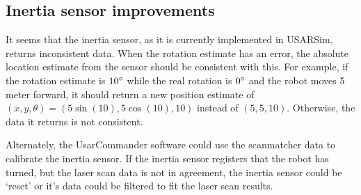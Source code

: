 \subsection{Inertia sensor improvements}
It seems that the inertia sensor, as it is currently implemented in USARSim, returns inconsistent data. When the rotation estimate has an error, the absolute location estimate from the sensor should be consistent with this. For example, if the rotation estimate is $10\degree$ while the real rotation is $0\degree$ and the robot moves 5 meter forward, it should return a new position estimate of $(x, y, \theta) = (5 \sin(10), 5 \cos(10), 10)$ instead of $(5, 5, 10)$. Otherwise, the data it returns is not consistent.

Alternately, the UsarCommander software could use the scanmatcher data to calibrate the inertia sensor. If the inertia sensor registers that the robot has turned, but the laser scan data is not in agreement, the inertia sensor could be `reset' or it's data could be filtered to fit the laser scan results.
